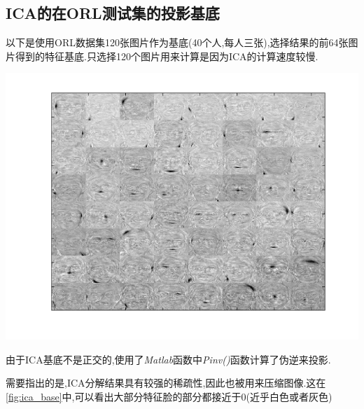\subsection{ICA的在ORL测试集的投影基底}
以下是使用ORL数据集120张图片作为基底(40个人,每人三张),选择结果的前64张图片得到的特征基底.只选择120个图片用来计算是因为ICA的计算速度较慢.
\begin{center}
\begin{minipage}[t]{\linewidth}
\center
{
\includegraphics[width=\textwidth]{Img/ica_base.png} 
\label{fig:ica_base}
}
\end{minipage}
\medskip
\end{center}
由于ICA基底不是正交的,使用了\textit{Matlab}函数中\textit{Pinv()}函数计算了伪逆来投影.



需要指出的是,ICA分解结果具有较强的稀疏性,因此也被用来压缩图像.这在\ref{fig:ica_base}中,可以看出大部分特征脸的部分都接近于0(近乎白色或者灰色)

